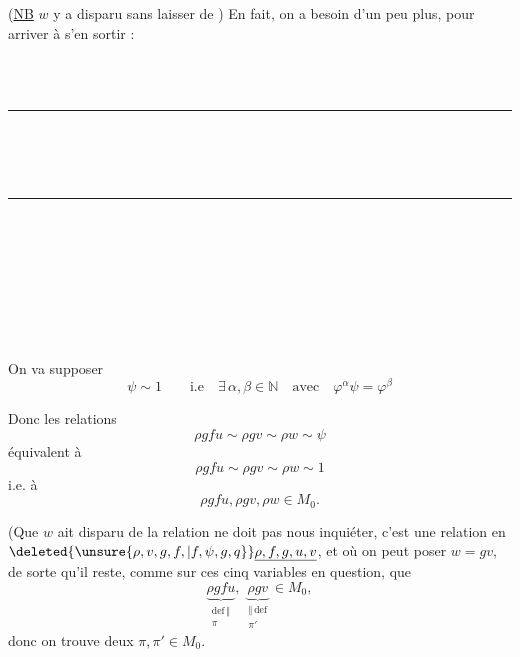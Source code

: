 (\uline{NB} $w$ y a disparu sans laisser de ) En fait, on a besoin d'un peu plus, pour arriver à s'en sortir :
\par\smallskip
{\footnotesize\noindent\begin{minipage}[t]{.46\linewidth}\raggedright
{}\\ \\ \rule{2.6em}{.3pt}\\ \\ \\ \rule{2.6em}{.3pt}\\ \\ 
\end{minipage}\hfill%
\begin{minipage}[t]{.51\linewidth}\raggedright
{}\\ \\ \\ \\ 
\end{minipage}\par}


On va supposer
\[
\boxed{\psi\sim1\qquad\text{i.e}\quad\exists\,\alpha,\beta\in\mathbb N}\quad\text{avec}\quad\boxed{\varphi^\alpha\psi=\varphi^\beta}
\]

Donc les relations
\[
\rho gfu\sim\rho gv\sim\rho w\sim\psi
\]
équivalent à
\[
\rho gfu\sim\rho gv\sim\rho w\sim1
\]
i.e. à
\[
\boxed{\rho gfu,\rho gv,\rho w\in M_0.}
\]

(Que $w$ ait disparu de la relation   ne doit pas nous inquiéter, c'est une relation en $\deleted{\unsure{\rho,v,g,f,|f,\psi,g,q}}\underline{\rho,f,g,u,v}$, et où on peut poser $w=gv$, de sorte qu'il  reste, comme  sur ces cinq variables en question, que
\[
\underbrace{\rho gfu}_{\substack{\mathrm{def}\,\Vert\\\pi}},\ \underbrace{\rho gv}_{\substack{\Vert\,\mathrm{def}\\\pi'}}\in M_0,
\]
donc on trouve deux  $\pi,\pi'\in M_0$.

